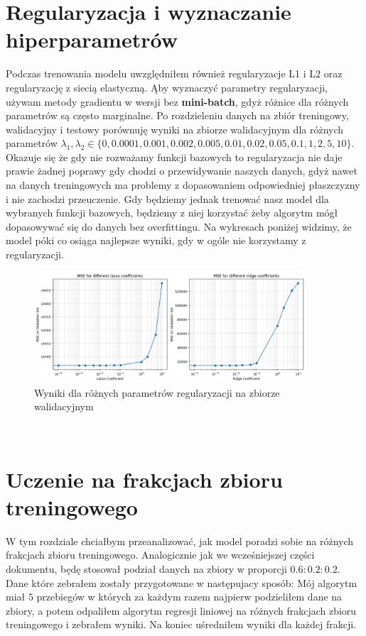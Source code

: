 \documentclass[polish,12pt,a4paper]{extarticle}
\begin{document}
\section*{Regularyzacja i wyznaczanie hiperparametrów}
Podczas trenowania modelu uwzględniłem również regularyzacje L1 i L2 oraz regularyzację z siecią elastyczną. Ąby wyznaczyć parametry regularyzacji, używam metody gradientu w wersji bez \textbf{mini-batch}, gdyż różnice dla różnych parametrów są często marginalne. Po rozdzieleniu danych na zbiór treningowy, walidacyjny i testowy porównuję wyniki na zbiorze walidacyjnym dla różnych parametrów $\lambda_1, \lambda_2 \in \{0, 0.0001, 0.001, 0.002, 0.005, 0.01, 0.02, 0.05, 0.1, 1, 2, 5, 10\}$. \bigskip \\
Okazuje się że gdy nie rozważamy funkcji bazowych to regularyzacja nie daje prawie żadnej poprawy gdy chodzi o przewidywanie naszych danych, gdyż nawet na danych treningowych ma problemy z dopasowaniem odpowiedniej płaszczyzny i nie zachodzi przeuczenie. Gdy będziemy jednak trenować nasz model dla wybranych funkcji bazowych, będziemy z niej korzystać żeby algorytm mógł dopasowywać się do danych bez overfittingu. Na wykresach poniżej widzimy, że model póki co osiąga najlepsze wyniki, gdy w ogóle nie korzystamy z regularyzacji.
\begin{figure}
    \centering
    \includegraphics[width=0.9\textwidth]{data/valid_reg_coef.png}
    \caption{Wyniki dla różnych parametrów regularyzacji na zbiorze walidacyjnym}
\end{figure} \\
\FloatBarrier
\section*{Uczenie na frakcjach zbioru treningowego}
W tym rozdziale chciałbym przeanalizować, jak model poradzi sobie na różnych frakcjach zbioru treningowego. Analogicznie jak we wcześniejszej części dokumentu, będę stosował podział danych na zbiory w proporcji $0.6 : 0.2 : 0.2$. Dane które zebrałem zostały przygotowane w następujacy sposób: Mój algorytm miał $5$ przebiegów w których za każdym razem najpierw podzieliłem dane na zbiory, a potem odpaliłem algorytm regresji liniowej na różnych frakcjach zbioru treningowego i zebrałem wyniki. Na koniec uśredniłem wyniki dla każdej frakcji.
\end{document}
